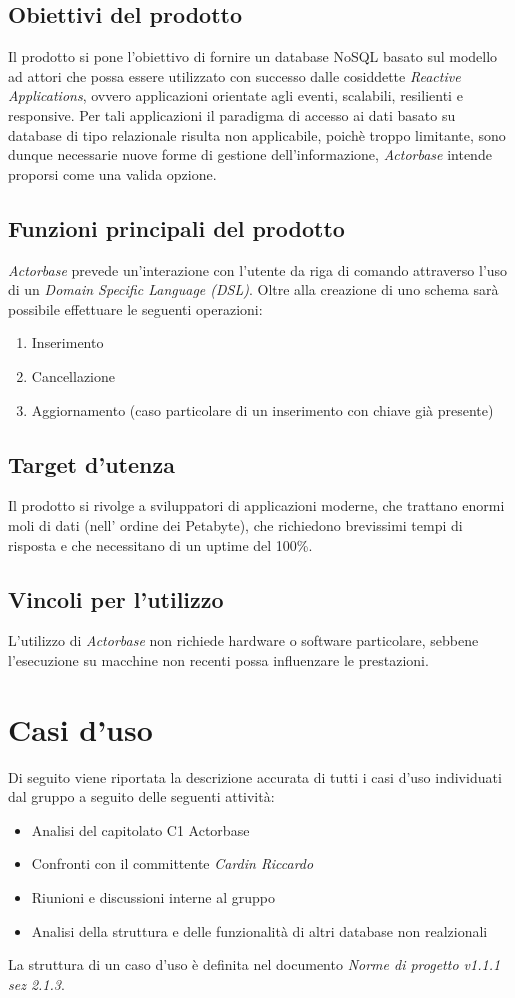 \documentclass[a4paper]{report}
\newcommand{\mychapter}[2]{
	\setcounter{chapter}{#1}
	\setcounter{section}{0}
	\setcounter{subsection}{1}
	\chapter*{#2}
	\addcontentsline{toc}{chapter}{#2}
}
\begin{document}
	\section{Obiettivi del prodotto}
		Il prodotto si pone l'obiettivo di fornire un database NoSQL basato sul modello ad attori che possa 
		essere utilizzato con successo dalle cosiddette \emph{Reactive Applications}, ovvero applicazioni
		orientate agli eventi, scalabili, resilienti e responsive. Per tali applicazioni il paradigma di accesso 
		ai dati basato su database di tipo relazionale risulta non applicabile, poichè troppo limitante, sono 
		dunque necessarie nuove forme di gestione dell'informazione, \emph{Actorbase} intende proporsi 
		come una valida opzione.
	\section{Funzioni principali del prodotto}
		\emph{Actorbase} prevede un'interazione con l'utente da riga di comando attraverso l'uso di un 
		\emph{Domain Specific Language (DSL)}. 
		Oltre alla creazione di uno schema sarà possibile effettuare le seguenti operazioni:
		\begin{enumerate}
			\item Inserimento
			\item Cancellazione 
			\item Aggiornamento (caso particolare di un inserimento con chiave già presente)
		\end{enumerate}
	\section{Target d'utenza}
		Il prodotto si rivolge a sviluppatori di applicazioni moderne, che trattano enormi moli di dati (nell'
		ordine dei Petabyte), che richiedono brevissimi tempi di risposta e che necessitano di un uptime 
		del 100\%.
	\section{Vincoli per l'utilizzo}
		L'utilizzo di \emph{Actorbase} non richiede hardware o software particolare, sebbene l'esecuzione 
		su macchine non recenti possa influenzare le prestazioni.	
	
	\mychapter{3}{Casi d'uso}
		Di seguito viene riportata la descrizione accurata di tutti i casi d'uso individuati dal gruppo a seguito
		delle seguenti attività:
		\begin{itemize}
			\item Analisi del capitolato C1 Actorbase
			\item Confronti con il committente \emph{Cardin Riccardo}
			\item Riunioni e discussioni interne al gruppo
			\item Analisi della struttura e delle funzionalità di altri database non realzionali
		\end{itemize}
		La struttura di un caso d'uso è definita nel documento \emph{Norme di progetto v1.1.1 sez 2.1.3}.
		\newpage
\end{document}
